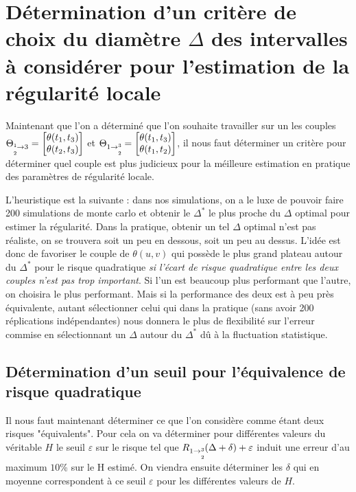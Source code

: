\section{Détermination d'un critère de choix du diamètre $\Delta$ des intervalles à considérer pour l'estimation de la régularité locale}


Maintenant que l'on a déterminé que l'on souhaite travailler sur un les couples $\Theta_{\overset 1{\underset{2}{ }} \rightarrow3} = \begin{bmatrix} \theta(t_1, t_3) \\ \theta(t_2, t_3) \end{bmatrix}$ et $\Theta_{1 \rightarrow \overset{3}{\underset {2}{}}} = \begin{bmatrix} \theta(t_1, t_3) \\ \theta(t_1, t_2) \end{bmatrix}$, il nous faut déterminer un critère pour déterminer quel couple est plus judicieux pour la méilleure estimation en pratique des paramètres de régularité locale.

L'heuristique est la suivante : dans nos simulations, on a le luxe de pouvoir faire 200 simulations de monte carlo et obtenir le $\Delta^*$ le plus proche du $\Delta$ optimal pour estimer la régularité. Dans la pratique, obtenir un tel $\Delta$ optimal n'est pas réaliste, on se trouvera soit un peu en dessous, soit un peu au dessus. L'idée est donc de favoriser le couple de $\theta(u,v)$ qui possède le plus grand plateau autour du $\Delta^*$ pour le risque quadratique \emph{si l'écart de risque quadratique entre les deux couples n'est pas trop important}. Si l'un est beaucoup plus performant que l'autre, on choisira le plus performant. Mais si la performance des deux est à peu près équivalente, autant sélectionner celui qui dans la pratique (sans avoir 200 réplications indépendantes) nous donnera le plus de flexibilité sur l'erreur commise en sélectionnant un $\Delta$ autour du $\Delta^*$ dû à la fluctuation statistique.

\subsection{Détermination d'un seuil pour l'équivalence de risque quadratique}

Il nous faut maintenant déterminer ce que l'on considère comme étant deux risques "équivalents". Pour cela on va déterminer pour différentes valeurs du véritable $H$ le seuil $\varepsilon$ sur le risque tel que $R_{1 \rightarrow \overset{3}{\underset {2}{}}}(\Delta + \delta) + \varepsilon$ induit une erreur d'au maximum $10$\% sur le H estimé. On viendra ensuite déterminer les $\delta$ qui en moyenne correspondent à ce seuil $\varepsilon$ pour les différentes valeurs de $H$.

